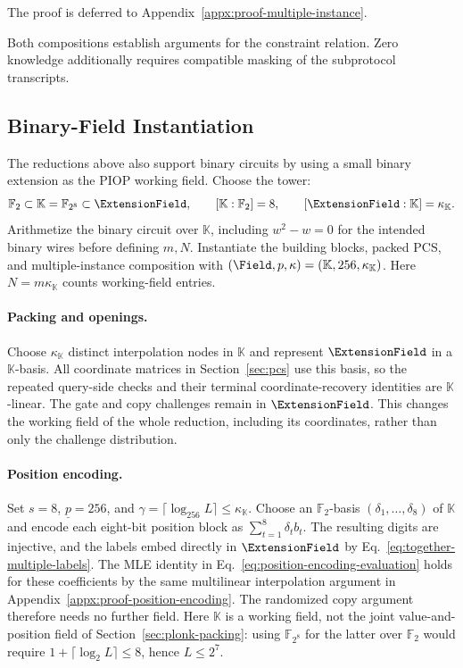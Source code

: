 The proof is deferred to
Appendix~\ref{appx:proof-multiple-instance}.

Both compositions establish arguments for the constraint
relation. Zero knowledge additionally requires compatible masking
of the subprotocol transcripts.

\subsection{Binary-Field Instantiation}
\label{sec:binary-packing}

The reductions above also support binary circuits by using a
small binary extension as the PIOP working field. Choose the tower:
\[
    \mathbb F_2\subset\mathbb K=\mathbb F_{2^8}
       \subset\ExtensionField,
    \qquad [\mathbb K:\mathbb F_2]=8,
    \qquad [\ExtensionField:\mathbb K]=\kappa_{\mathbb K}.
\]
Arithmetize the binary circuit over \(\mathbb K\), including
\(w^2-w=0\) for the intended binary wires before defining
\(m,N\). Instantiate the building blocks, packed PCS, and
multiple-instance composition with
\((\Field,p,\kappa)=(\mathbb K,256,\kappa_{\mathbb K})\).
Here \(N=m\kappa_{\mathbb K}\) counts working-field entries.

\paragraph{Packing and openings.}
Choose \(\kappa_{\mathbb K}\) distinct interpolation nodes in
\(\mathbb K\) and represent \(\ExtensionField\) in a
\(\mathbb K\)-basis. All coordinate matrices in
Section~\ref{sec:pcs} use this basis, so the repeated query-side
checks and their terminal coordinate-recovery identities are
\(\mathbb K\)-linear. The gate and copy challenges remain in
\(\ExtensionField\). This changes the working field of the
whole reduction, including its coordinates, rather than only
the challenge distribution.

\paragraph{Position encoding.}
Set \(s=8\), \(\underline p=256\), and
\(\gamma=\lceil\log_{256}L\rceil\leq\kappa_{\mathbb K}\).
Choose an \(\mathbb F_2\)-basis
\((\delta_1,\ldots,\delta_8)\) of \(\mathbb K\) and encode each
eight-bit position block as \(\sum_{t=1}^8\delta_tb_t\).
The resulting digits are injective, and the labels embed directly
in \(\ExtensionField\) by Eq.~\eqref{eq:together-multiple-labels}.
The MLE identity in Eq.~\eqref{eq:position-encoding-evaluation}
holds for these coefficients by the same multilinear interpolation
argument in Appendix~\ref{appx:proof-position-encoding}.
The randomized copy argument therefore needs no further field.
Here \(\mathbb K\) is a working field, not the joint
value-and-position field of Section~\ref{sec:plonk-packing}:
using \(\mathbb F_{2^8}\) for the latter over \(\mathbb F_2\)
would require \(1+\lceil\log_2L\rceil\leq8\), hence \(L\leq2^7\).

